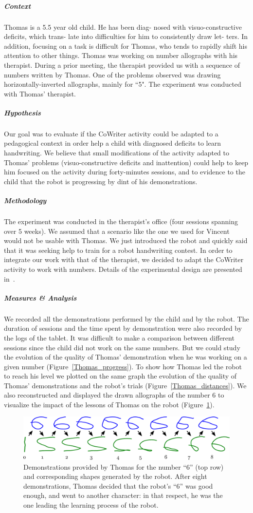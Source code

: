 \documentclass[10pt,a4paper]{article}
\begin{document}
\subparagraph{Context}
Thomas is a 5.5 year old child. He has been diag-
nosed with visuo-constructive deficits, which trans-
late into difficulties for him to consistently draw let-
ters. In addition, focusing on a task is difficult for
Thomas, who tends to rapidly shift his attention to other things. 
Thomas was working on number allographs with his therapist. During a prior
meeting, the therapist provided us with a sequence of numbers
written by Thomas. One of the problems observed was drawing
horizontally-inverted allographs, mainly for ``5". The experiment was conducted with Thomas' therapist. 
\subparagraph{Hypothesis}
Our goal was to evaluate if the CoWriter activity could be adapted to a pedagogical context in order help a child with diagnosed deficits to learn handwriting. We believe that small modifications of the activity adapted to
Thomas' problems (visuo-constructive deficits and inattention) could help to
keep him focused on the activity during forty-minutes sessions, and to evidence to the child that the robot is progressing by dint of his demonstrations. 
\subparagraph{Methodology}
The experiment was conducted in the therapist's office (four sessions 
spanning over 5 weeks). We assumed that a scenario like the one we used 
for Vincent would not be usable with Thomas. We just introduced the robot 
and quickly said that it was seeking help to train for a robot handwriting contest. In order to integrate our work with that of the therapist, we decided to adapt the 
CoWriter activity to work with numbers. Details of the experimental design are presented in~\cite{jacq2016building}.
\subparagraph{Measures \& Analysis}
We recorded all the demonstrations performed by the child and by the robot. The duration of sessions and the time spent by demonstration were also recorded by the logs of the tablet. It was difficult to make a comparison between different sessions since the child did not work on the same numbers. But we could study the evolution of the quality of Thomas' demonstration when he was working on a given number (Figure~\ref{Thomas_progress}).
To show how Thomas led the robot to reach his level we plotted on the same graph the evolution of the quality of Thomas' demonstrations and the robot's trials (Figure~\ref{Thomas_distances}). We also reconstructed and displayed the drawn allographs of the number 6 to visualize the impact of the lessons of Thomas on the robot (Figure~\ref{learning_6_demos}). 
\begin{figure}[!]
    \centering
    \includegraphics[width=0.6\linewidth]{learning_6_demos}
    \caption{\small Demonstrations provided by Thomas for the number ``6'' (top row) and
        corresponding shapes generated by the robot. After eight demonstrations,
        Thomas decided that the robot's ``6'' was good enough, and went to
    another character: in that respect, he was the one leading the learning
process of the robot.}
    \label{learning_6_demos}
\end{figure}
\end{document}
